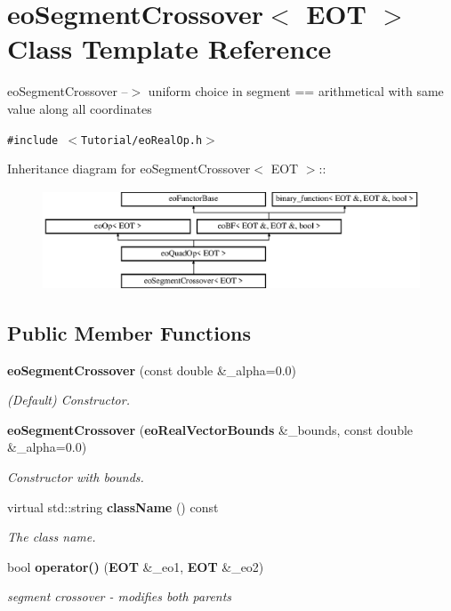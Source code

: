 \section{eo\-Segment\-Crossover$<$ EOT $>$ Class Template Reference}
\label{classeo_segment_crossover}
eo\-Segment\-Crossover --$>$ uniform choice in segment == arithmetical with same value along all coordinates  


{\tt \#include $<$Tutorial/eo\-Real\-Op.h$>$}

Inheritance diagram for eo\-Segment\-Crossover$<$ EOT $>$::\begin{figure}[H]
\begin{center}
\leavevmode
\includegraphics[height=2.96296cm]{classeo_segment_crossover}
\end{center}
\end{figure}
\subsection*{Public Member Functions}
\begin{CompactItemize}
\item 
{\bf eo\-Segment\-Crossover} (const double \&\_\-alpha=0.0)
\begin{CompactList}\small\item\em (Default) Constructor. \item\end{CompactList}\item 
{\bf eo\-Segment\-Crossover} ({\bf eo\-Real\-Vector\-Bounds} \&\_\-bounds, const double \&\_\-alpha=0.0)
\begin{CompactList}\small\item\em Constructor with bounds. \item\end{CompactList}\item 
virtual std::string {\bf class\-Name} () const \label{classeo_segment_crossover_a2}

\begin{CompactList}\small\item\em The class name. \item\end{CompactList}\item 
bool {\bf operator()} ({\bf EOT} \&\_\-eo1, {\bf EOT} \&\_\-eo2)
\begin{CompactList}\small\item\em segment crossover - modifies both parents \item\end{CompactList}\end{CompactItemize}
